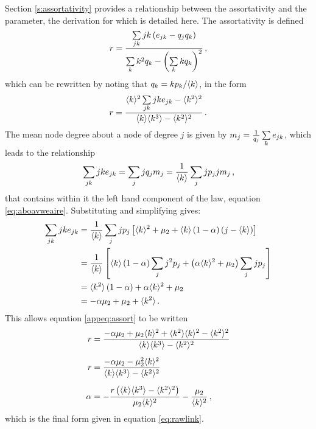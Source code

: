 Section \ref{s:assortativity} provides a relationship between the assortativity  and the \aw{} parameter, the derivation for which is detailed here.
The assortativity is defined
\begin{equation}
	r = \frac{\sum\limits_{jk} jk\left(e_{jk}-q_jq_k\right)}{\sum\limits_k k^2q_k - \left(\sum\limits_k kq_k\right)^2}\,,
\end{equation}
which can be rewritten by noting that $q_k=kp_k/\langle k \rangle$, in the form
\begin{equation}
	\label{appeq:assort}
	r = \frac{\langle k \rangle^2\sum\limits_{jk} jke_{jk}-\langle k^2 \rangle^2}{\langle k \rangle\langle k^3 \rangle-\langle k^2 \rangle^2}\,.
\end{equation}
The mean node degree about a node of degree $j$ is given by $m_j=\frac{1}{q_j}\sum\limits_k e_{jk}$, which leads to the relationship
\begin{equation}
	\sum\limits_{jk} jk e_{jk} = \sum\limits_j jq_jm_j = \frac{1}{\langle k \rangle}\sum\limits_j jp_j jm_j\,,
\end{equation}
that contains within it the left hand component of the \aw{} law, equation \eqref{eq:aboavweaire}.
Substituting and simplifying gives:
\begin{align}
	\sum\limits_{jk} jk e_{jk} &= \frac{1}{\langle k \rangle}\sum\limits_j jp_j\left[\langle k \rangle^2+\mu_2+\langle k \rangle\left(1-\alpha\right)\left(j-\langle k \rangle\right)\right] \\
	&= \frac{1}{\langle k \rangle}\left[ \langle k \rangle\left(1-\alpha\right)\sum\limits_j j^2p_j + \left(\alpha\langle k \rangle^2+\mu_2\right)\sum\limits_j jp_j\right] \nonumber \\
	&= \langle k^2 \rangle\left(1-\alpha\right)+\alpha\langle k \rangle^2+\mu_2 \nonumber \\
	&=-\alpha\mu_2+\mu_2+\langle k^2 \rangle\,.
\end{align}
This allows equation \eqref{appeq:assort} to be written
\begin{align}
	r &= \frac{-\alpha\mu_2+\mu_2\langle k \rangle^2+\langle k^2 \rangle\langle k \rangle^2-\langle k^2 \rangle^2}{\langle k \rangle\langle k^3 \rangle-\langle k^2 \rangle^2} \\[0.5em]
	r &= \frac{-\alpha\mu_2-\mu_2^2\langle k \rangle^2}{\langle k \rangle\langle k^3 \rangle-\langle k^2 \rangle^2} \nonumber \\[0.5em]
	\alpha &= -\frac{r\left(\langle k \rangle\langle k^3 \rangle-\langle k^2 \rangle^2\right)}{\mu_2\langle k \rangle^2}-\frac{\mu_2}{\langle k \rangle^2}\,,
\end{align}
which is the final form given in equation \eqref{eq:rawlink}.